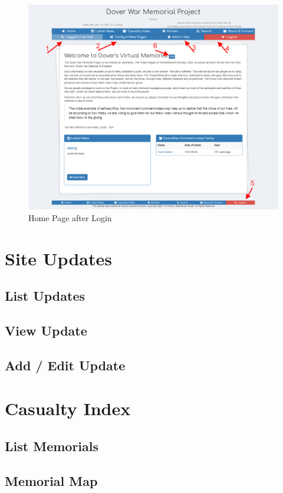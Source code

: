 \documentclass[12pt]{article}
\begin{document}
\begin{figure}[h]
  \centering
 \includegraphics[width=\textwidth]{pics/home_login.png}
	\caption{Home Page after Login}\label{fig:home_login}
\end{figure}

\FloatBarrier
\section{Site Updates}\label{sec:siteUpdate}

\subsection{List Updates}
\subsection{View Update}
\subsection{Add / Edit Update}


\section{Casualty Index}\label{sec:casualtyIndex}

\subsection{List Memorials}
\subsection{Memorial Map}
\end{document}
